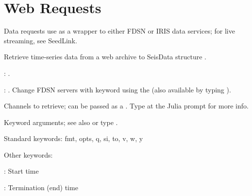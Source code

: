 \documentclass[letterpaper,11pt,english]{sphinxmanual}
\begin{document}
\section{Web Requests}
\label{\detokenize{src/Web/webclients:web-requests}}\label{\detokenize{src/Web/webclients::doc}}
Data requests use  as a wrapper to either FDSN or IRIS data services; for live streaming, see SeedLink.


\begin{fulllineitems}
\end{fulllineitems}



\begin{fulllineitems}
\end{fulllineitems}


\begin{DUlineblock}{0em}
\item[] Retrieve time-series data from a web archive to SeisData structure .
\item[] 
\item[] 
\item[] : {\hyperref[\detokenize{src/Web/webclients:irisws}]{}}.
\item[] : {\hyperref[\detokenize{src/Web/webclients:fdsnws}]{}}. Change FDSN servers with keyword  using the {\hyperref[\detokenize{src/Appendices/web_syntax:servers}]{}} (also available by typing ).
\item[] 
\item[] 
\item[] Channels to retrieve; can be passed as a {\hyperref[\detokenize{src/Appendices/web_syntax:cid}]{}}. Type  at the Julia prompt for more info.
\item[] 
\item[] 
\item[] Keyword arguments; see also {\hyperref[\detokenize{src/Appendices/keywords:dkw}]{}} or type .
\item[] Standard keywords: fmt, opts, q, si, to, v, w, y
\item[] Other keywords:
\item[] : Start time
\item[] : Termination (end) time
\end{DUlineblock}
\end{document}
